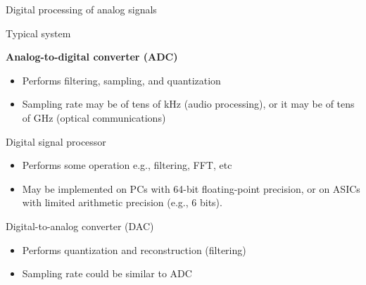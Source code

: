 \documentclass[10pt]{beamer}
\begin{document}
\begin{frame}{Digital processing of analog signals}
	\begin{block}{Typical system}
		\vspace{-0.7cm}
		\begin{center}
			\resizebox{\linewidth}{!}{}
		\end{center}
	\end{block}
	\vspace{-0.5cm}
	\begin{block}{\textbf{Analog-to-digital converter (ADC)}}
		\begin{itemize}
			\item Performs filtering, sampling, and quantization
			\item Sampling rate may be of tens of kHz (audio processing), or it may be of tens of GHz (optical communications)
		\end{itemize}
	\end{block}
	\vspace{-0.3cm}
	\begin{block}{Digital signal processor}
		\begin{itemize} \itemsep 0pt
			\item Performs some operation e.g., filtering, FFT, etc
			\item May be implemented on PCs with 64-bit floating-point precision, or on ASICs with limited arithmetic precision (e.g., 6 bits).
		\end{itemize}
	\end{block}
	\vspace{-0.3cm}
	\begin{block}{Digital-to-analog converter (DAC)}
		\begin{itemize}
			\item Performs quantization and reconstruction (filtering)
			\item Sampling rate could be similar to ADC
		\end{itemize}
	\end{block}
\end{frame}
\end{document}
